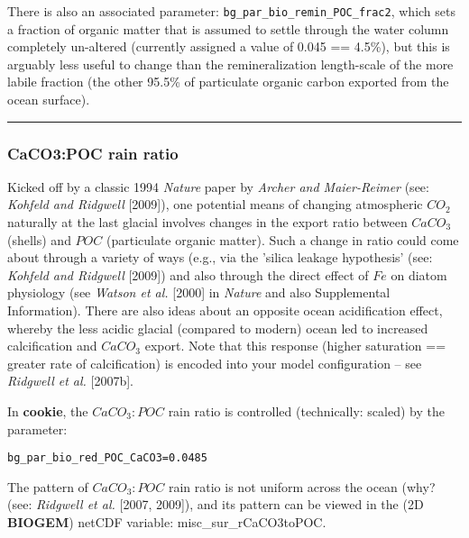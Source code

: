 There is also an associated parameter: \texttt{bg\_par\_bio\_remin\_POC\_frac2}, which sets a fraction of organic matter that is assumed to settle through the water column completely un-altered (currently assigned a value of 0.045 == 4.5\%), but this is arguably less useful to change than the remineralization length-scale of the more labile fraction (the other 95.5\% of particulate organic carbon exported from the ocean surface).

\vspace{1mm} \noindent\rule{4cm}{0.5pt} \vspace{2mm}

\subsubsection*{CaCO3:POC rain ratio}

\vspace{2mm}
Kicked off by a classic 1994 \textit{Nature} paper by \textit{Archer and Maier-Reimer} (see: \textit{Kohfeld and Ridgwell} [2009]), one potential means of changing atmospheric \(CO_{2}\) naturally at the last glacial involves changes in the export ratio between \(CaCO_{3}\) (shells) and \(POC\) (particulate organic matter). Such a change in ratio could come about through a variety of ways (e.g., via the 'silica leakage hypothesis' (see: \textit{Kohfeld and Ridgwell} [2009]) and also through the direct effect of \(Fe\) on diatom physiology (see \textit{Watson et al.} [2000] in \textit{Nature} and also Supplemental Information). There are also ideas about an opposite ocean acidification effect, whereby the less acidic glacial (compared to modern) ocean led to increased calcification and \(CaCO_{3}\) export. Note that this response (higher saturation == greater rate of calcification) is encoded into your model configuration – see \textit{Ridgwell et al.} [2007b].

\vspace{1mm}
In \textbf{cookie}, the \(CaCO_{3}:POC\) rain ratio is controlled (technically: scaled) by the parameter:
\vspace{-1mm}\small\begin{verbatim}
bg_par_bio_red_POC_CaCO3=0.0485
\end{verbatim}\normalsize\vspace{-1mm}

The pattern of \(CaCO_{3}:POC\) rain ratio is not uniform across the ocean (why? (see: \textit{Ridgwell et al.} [2007, 2009]), and its pattern can be viewed in the (2D \textbf{BIOGEM}) netCDF variable: \textsf{\footnotesize misc\_sur\_rCaCO3toPOC}.

